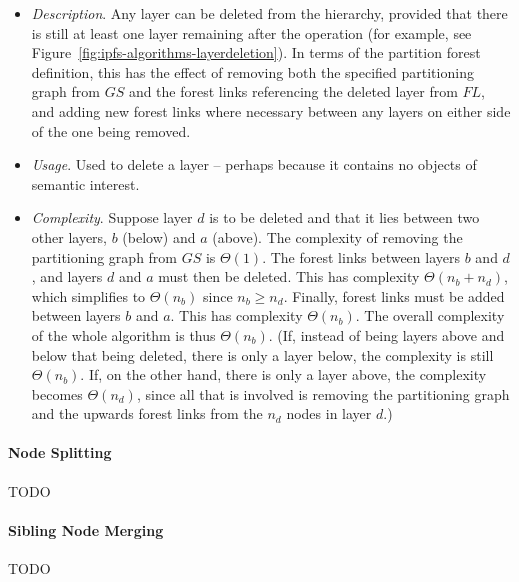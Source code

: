 \begin{itemize}

\item \emph{Description}. Any layer can be deleted from the hierarchy, provided that there is still at least one layer remaining after the operation (for example, see Figure~\ref{fig:ipfs-algorithms-layerdeletion}). In terms of the partition forest definition, this has the effect of removing both the specified partitioning graph from $\textit{GS}$ and the forest links referencing the deleted layer from $\textit{FL}$, and adding new forest links where necessary between any layers on either side of the one being removed.

\item \emph{Usage}. Used to delete a layer -- perhaps because it contains no objects of semantic interest.

\item \emph{Complexity}. Suppose layer $d$ is to be deleted and that it lies between two other layers, $b$ (below) and $a$ (above). The complexity of removing the partitioning graph from $\textit{GS}$ is $\Theta(1)$. The forest links between layers $b$ and $d$, and layers $d$ and $a$ must then be deleted. This has complexity $\Theta(n_b + n_d)$, which simplifies to $\Theta(n_b)$ since $n_b \ge n_d$. Finally, forest links must be added between layers $b$ and $a$. This has complexity $\Theta(n_b)$. The overall complexity of the whole algorithm is thus $\Theta(n_b)$. (If, instead of being layers above and below that being deleted, there is only a layer below, the complexity is still $\Theta(n_b)$. If, on the other hand, there is only a layer above, the complexity becomes $\Theta(n_d)$, since all that is involved is removing the partitioning graph and the upwards forest links from the $n_d$ nodes in layer $d$.)

\end{itemize}


\paragraph{Node Splitting}

TODO

\paragraph{Sibling Node Merging}

TODO

